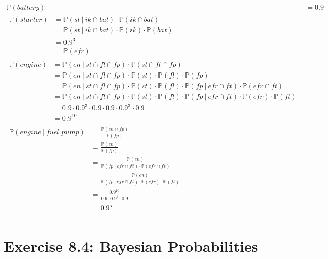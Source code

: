 \documentclass[a4paper]{scrartcl}
\newcommand{\prob}{\mathbb{P}}
\def \blattnr {8}
\begin{document}
\begin{align*}
    \prob(battery) &= \num{0,9} \\
    \begin{split}
        \prob(starter)
        &= \prob(st\ |\ ik \cap bat) \cdot \prob(ik \cap bat) \\
        &= \prob(st\ |\ ik \cap bat) \cdot \prob(ik) \cdot \prob(bat) \\
        &=\num{0,9}^3 \\
        &= \prob(efr)
    \end{split} \\
    \begin{split}
        \prob(engine)
        &= \prob(en\ |\ st \cap fl \cap fp) \cdot \prob(st \cap fl \cap fp) \\
        &= \prob(en\ |\ st \cap fl \cap fp) \cdot \prob(st) \cdot \prob(fl) \cdot \prob(fp) \\
        &= \prob(en\ |\ st \cap fl \cap fp) \cdot \prob(st) \cdot \prob(fl) \cdot \prob(fp\ |\ efr \cap ft) \cdot \prob(efr \cap ft) \\
        &= \prob(en\ |\ st \cap fl \cap fp) \cdot \prob(st) \cdot \prob(fl) \cdot \prob(fp\ |\ efr \cap ft) \cdot \prob(efr) \cdot \prob(ft) \\
        &= \num{0,9} \cdot \num{0,9}^3 \cdot \num{0,9} \cdot \num{0,9} \cdot \num{0,9}^3 \cdot \num{0,9} \\
        &= \num{0,9}^{10}
    \end{split} \\
    \begin{split}
        \prob(engine\ |\ fuel\_pump)
        &= \frac{\prob(en \cap fp)}{\prob(fp)} \\
        &= \frac{\prob(en)}{\prob(fp)} \\
        &= \frac{\prob(en)}{\prob(fp\ |\ efr \cap ft) \cdot \prob(efr \cap ft)} \\
        &= \frac{\prob(en)}{\prob(fp\ |\ efr \cap ft) \cdot \prob(efr) \cdot \prob(ft)} \\
        &= \frac{\num{0,9}^{10}}{\num{0,9} \cdot \num{0,9}^3 \cdot \num{0,9}} \\
        &= \num{0,9}^5 \\
    \end{split}
\end{align*}


\section*{Exercise \blattnr.4: Bayesian Probabilities}
\end{document}
